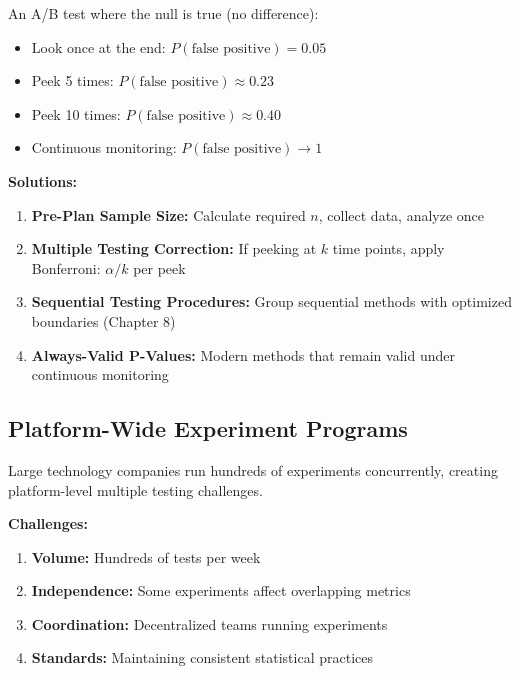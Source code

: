 \begin{example}
An A/B test where the null is true (no difference):
\begin{itemize}
    \item Look once at the end: $P(\text{false positive}) = 0.05$
    \item Peek 5 times: $P(\text{false positive}) \approx 0.23$
    \item Peek 10 times: $P(\text{false positive}) \approx 0.40$
    \item Continuous monitoring: $P(\text{false positive}) \to 1$
\end{itemize}
\end{example}

\textbf{Solutions:}

\begin{enumerate}
    \item \textbf{Pre-Plan Sample Size:} Calculate required $n$, collect data, analyze once

    \item \textbf{Multiple Testing Correction:} If peeking at $k$ time points, apply Bonferroni: $\alpha/k$ per peek

    \item \textbf{Sequential Testing Procedures:} Group sequential methods with optimized boundaries (Chapter 8)

    \item \textbf{Always-Valid P-Values:} Modern methods that remain valid under continuous monitoring
\end{enumerate}

\subsection{Platform-Wide Experiment Programs}

Large technology companies run hundreds of experiments concurrently, creating platform-level multiple testing challenges.

\textbf{Challenges:}

\begin{enumerate}
    \item \textbf{Volume:} Hundreds of tests per week

    \item \textbf{Independence:} Some experiments affect overlapping metrics

    \item \textbf{Coordination:} Decentralized teams running experiments

    \item \textbf{Standards:} Maintaining consistent statistical practices
\end{enumerate}

